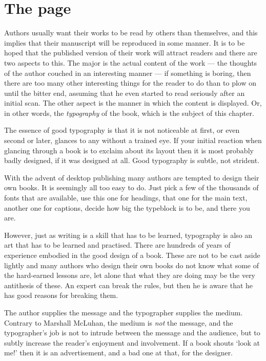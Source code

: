 \documentclass[10pt,a4paper,extrafontsizes]{memoir}
\begin{document}
\chapter{The page}  \label{chap:lpage}

\begin{paracol}{2}
\switchEng
    Authors usually want their works to be read by others than themselves,
and this implies that their manuscript will be reproduced in some manner.
It is to be hoped that the published version of their work will attract 
readers and there are two aspects to this. The major is the actual content
of the work --- the thoughts of the author couched in an interesting
manner --- if something is boring, then there are too many other interesting
things for the reader to do than to plow on until the bitter end, 
assuming that he
even started to read seriously after an initial scan. The other aspect is
the manner in which the content is displayed. Or, in other words, 
the \emph{typography}
of the book, which is the subject of this chapter.

    The essence of good typography is that it is not noticeable at first,
or even second or later, glances to any without a trained eye. If your
initial reaction when glancing through a book is to exclaim about its layout
then it is most probably badly designed, if it was designed at all. Good
typography is subtle, not strident. 

    With the advent of desktop publishing
many authors are tempted to design their own books. It is seemingly all
too easy to do. Just pick a few of the thousands of fonts that are available,
use this one for headings, 
that one for the main text, another one for
captions, decide how big the typeblock is to be, and there you are.

    However, just as writing is a skill that has to be learned, typography
is also an art that has to be learned and practised. There are hundreds
of years of experience embodied in the good design of a book. These are
not to be cast aside lightly and many authors who design their own books
do not know what some of the hard-earned lessons are, let alone that what
they are doing may be the very antithesis of these. An expert can break
the rules, but then he is aware that he has good reasons for breaking them.

    The author supplies the message and the typographer supplies the medium.
Contrary to Marshall McLuhan, the medium is \emph{not} the message, 
and the typographer's job is not to
intrude between the message and the audience, but to subtly increase the
reader's enjoyment and involvement. If a book shouts `look at me!' then it
is an advertisement, and a bad one at that, for the designer.
\end{paracol}
\end{document}
